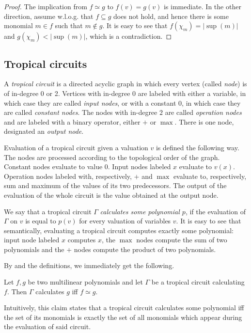\begin{proof}
    The implication from $f \simeq g$ to $f(v) = g(v)$ is immediate. In the other direction, assume w.l.o.g. that $f \subseteq g$ does not hold, and hence there is some monomial $m \in f$ such that $m \not\in g$.
    It is easy to see that $f(\chi_m) = |\sup(m)|$ and $g(\chi_m) < |\sup(m)|$, which is a contradiction.
\end{proof}


\subsection{Tropical circuits}

A \emph{tropical circuit} is a directed acyclic graph in which every vertex (called \emph{node}) is of in-degree 0 or 2. Vertices with in-degree 0 are labeled with either a variable, in which case they are called \emph{input nodes}, or with a constant $0$, in which case they are called \emph{constant nodes}. The nodes with in-degree $2$ are called \emph{operation nodes} and are labeled with a binary operator, either $+$ or $\max$. There is one node, designated an \emph{output node}.

Evaluation of a tropical circuit given a valuation $v$ is defined the following way. The nodes are processed according to the topological order of the graph. Constant nodes evaluate to value $0$. Input nodes labeled $x$ evaluate to $v(x)$. Operation nodes labeled with, respectively, $+$ and $\max$ evaluate to, respectively, sum and maximum of the values of its two predecessors. The output of the evaluation of the whole circuit is the value obtained at the output node.

We say that a tropical circuit $\Gamma$ \emph{calculates some polynomial $p$}, if the evaluation of $\Gamma$ on $v$ is equal to $p(v)$ for every valuation of variables $v$. It is easy to see that semantically, evaluating a tropical circuit computes exactly some polynomial: input node labeled $x$ computes $x$, the $\max$ nodes compute the sum of two polynomials and the $+$ nodes compute the product of two polynomials.


By  and the definitions, we immediately get the following.

\begin{prop}\label{prop:tc_semantics}
    Let $f, g$ be two multilinear polynomials and let $\Gamma$ be a tropical circuit calculating~$f$. Then $\Gamma$ calculates $g$ iff $f \simeq g$.
\end{prop}
Intuitively, this claim states that a tropical circuit calculates some polynomial iff the set of its monomials is exactly the set of all monomials which appear during the evaluation of said circuit.

